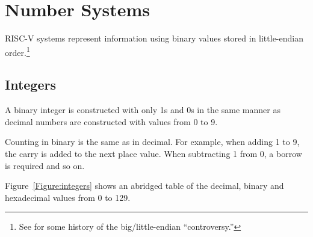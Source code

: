 \chapter{Number Systems}
\label{chapter:NumberSystems}

RISC-V systems represent information using binary values stored in 
little-endian order.\footnote{See\cite{IEN137} for some history of 
the big/little-endian ``controversy.''}

\section{Integers}

A binary integer is constructed with only 1s and 0s in the same
manner as decimal numbers are constructed with values from 0 to 9.

Counting in binary is the same as in decimal.  For example, when
adding 1 to 9, the carry is added to the next place value.  When
subtracting 1 from 0, a borrow is required and so on.

Figure~\autoref{Figure:integers} shows an abridged table of the 
decimal, binary and hexadecimal values from 0 to 129.

